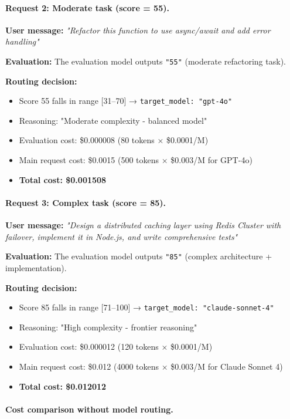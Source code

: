 \documentclass[english]{article}
\begin{document}
\paragraph{Request 2: Moderate task (score = 55).}

\textbf{User message:} \textit{"Refactor this function to use async/await and add error handling"}

\textbf{Evaluation:} The evaluation model outputs \texttt{"55"} (moderate refactoring task).

\textbf{Routing decision:}
\begin{itemize}
    \item Score 55 falls in range [31--70] → \texttt{target\_model: "gpt-4o"}
    \item Reasoning: "Moderate complexity - balanced model"
    \item Evaluation cost: \$0.000008 (80 tokens × \$0.0001/M)
    \item Main request cost: \$0.0015 (500 tokens × \$0.003/M for GPT-4o)
    \item \textbf{Total cost: \$0.001508}
\end{itemize}

\paragraph{Request 3: Complex task (score = 85).}

\textbf{User message:} \textit{"Design a distributed caching layer using Redis Cluster with failover, implement it in Node.js, and write comprehensive tests"}

\textbf{Evaluation:} The evaluation model outputs \texttt{"85"} (complex architecture + implementation).

\textbf{Routing decision:}
\begin{itemize}
    \item Score 85 falls in range [71--100] → \texttt{target\_model: "claude-sonnet-4"}
    \item Reasoning: "High complexity - frontier reasoning"
    \item Evaluation cost: \$0.000012 (120 tokens × \$0.0001/M)
    \item Main request cost: \$0.012 (4000 tokens × \$0.003/M for Claude Sonnet 4)
    \item \textbf{Total cost: \$0.012012}
\end{itemize}

\paragraph{Cost comparison without model routing.}
\end{document}
